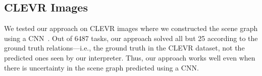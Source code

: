 \subsection{CLEVR Images}

We tested our approach on CLEVR images where we constructed the scene graph using a CNN~\cite{yi2018neural}. Out of 6487 tasks, our approach solved all but 25 according to the ground truth relations---i.e., the ground truth in the CLEVR dataset, not the predicted ones seen by our interpreter. Thus, our approach works well even when there is uncertainty in the scene graph predicted using a CNN.






